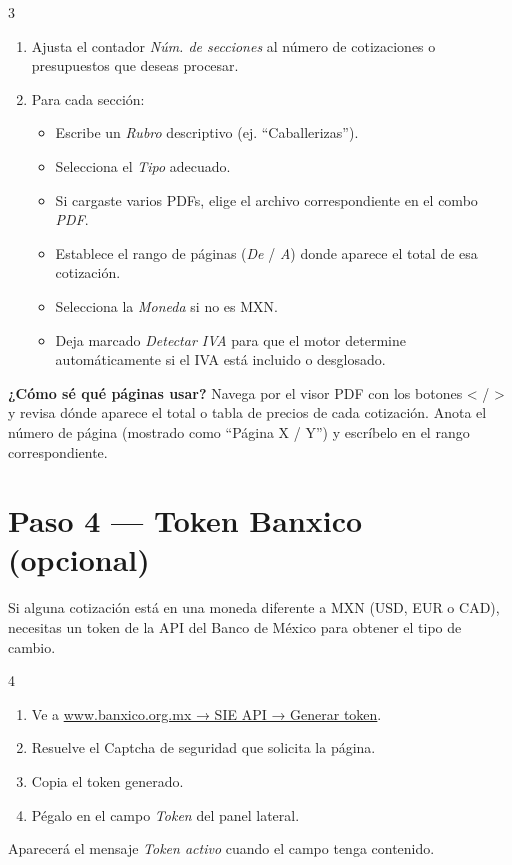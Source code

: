 \documentclass[12pt, a4paper, oneside]{report}
\newcommand{\campo}[1]{\textit{#1}}
\begin{document}
\begin{pasobox}{3}
\begin{enumerate}
  \item Ajusta el contador \campo{Núm. de secciones} al número de cotizaciones
        o presupuestos que deseas procesar.
  \item Para cada sección:
    \begin{itemize}
      \item Escribe un \campo{Rubro} descriptivo (ej. ``Caballerizas'').
      \item Selecciona el \campo{Tipo} adecuado.
      \item Si cargaste varios PDFs, elige el archivo correspondiente en el
            combo \campo{PDF}.
      \item Establece el rango de páginas (\campo{De} / \campo{A}) donde
            aparece el total de esa cotización.
      \item Selecciona la \campo{Moneda} si no es MXN.
      \item Deja marcado \campo{Detectar IVA} para que el motor determine
            automáticamente si el IVA está incluido o desglosado.
    \end{itemize}
\end{enumerate}
\end{pasobox}

\begin{notabox}
\textbf{¿Cómo sé qué páginas usar?} Navega por el visor PDF con los botones
< / > y revisa dónde aparece el total o tabla de precios de cada cotización.
Anota el número de página (mostrado como ``Página X / Y'') y escríbelo en el
rango correspondiente.
\end{notabox}

\section{Paso 4 — Token Banxico (opcional)}
\label{sec:banxico}

Si alguna cotización está en una moneda diferente a MXN (USD, EUR o CAD),
necesitas un token de la API del Banco de México para obtener el tipo de cambio.

\begin{pasobox}{4}
\begin{enumerate}
  \item Ve a \href{https://www.banxico.org.mx/SieAPIRest/service/v1/token}%
        {www.banxico.org.mx → SIE API → Generar token}.
  \item Resuelve el Captcha de seguridad que solicita la página.
  \item Copia el token generado.
  \item Pégalo en el campo \campo{Token} del panel lateral.
\end{enumerate}
Aparecerá el mensaje \textit{Token activo} cuando el campo tenga contenido.
\end{pasobox}
\end{document}
